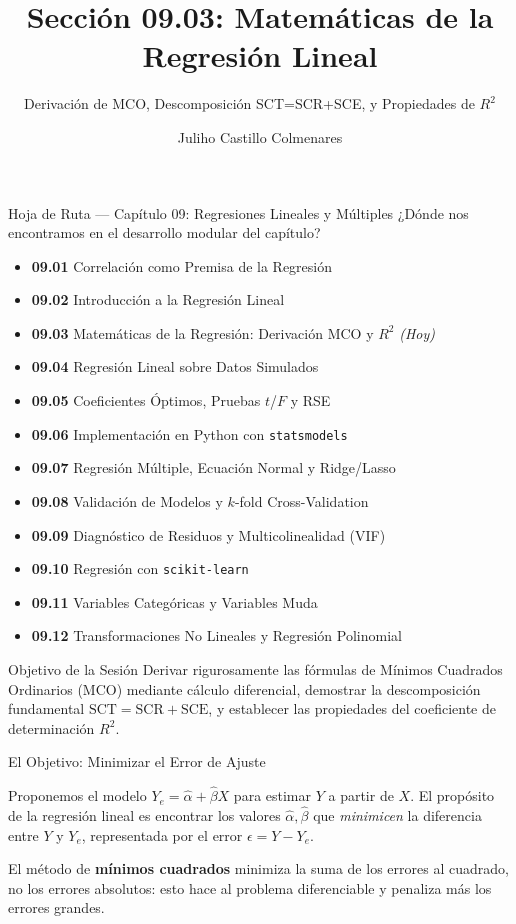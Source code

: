 \documentclass[10pt, aspectratio=169]{beamer}
\title[Matemáticas de la Regresión]{Sección 09.03: Matemáticas de la Regresión Lineal}
\subtitle{Derivación de MCO, Descomposición SCT=SCR+SCE, y Propiedades de $R^2$}
\author[J. Castillo Colmenares]{Juliho Castillo Colmenares}
\institute{Tecnológico de Monterrey}
\date{\vspace{-1.2cm}}
\begin{document}
\begin{frame}[plain]
  \vspace{-0.8cm}
  \titlepage
\end{frame}

\begin{frame}{Hoja de Ruta --- Capítulo 09: Regresiones Lineales y Múltiples}
  \scriptsize
  ¿Dónde nos encontramos en el desarrollo modular del capítulo?
  \begin{itemize}\itemsep=0.02em
    \item \textbf{09.01} Correlación como Premisa de la Regresión
    \item \textbf{09.02} Introducción a la Regresión Lineal
    \item \textbf{09.03} Matemáticas de la Regresión: Derivación MCO y $R^2$ \emph{(Hoy)}
    \item \textbf{09.04} Regresión Lineal sobre Datos Simulados
    \item \textbf{09.05} Coeficientes Óptimos, Pruebas $t$/$F$ y RSE
    \item \textbf{09.06} Implementación en Python con \texttt{statsmodels}
    \item \textbf{09.07} Regresión Múltiple, Ecuación Normal y Ridge/Lasso
    \item \textbf{09.08} Validación de Modelos y $k$-fold Cross-Validation
    \item \textbf{09.09} Diagnóstico de Residuos y Multicolinealidad (VIF)
    \item \textbf{09.10} Regresión con \texttt{scikit-learn}
    \item \textbf{09.11} Variables Categóricas y Variables Muda
    \item \textbf{09.12} Transformaciones No Lineales y Regresión Polinomial
  \end{itemize}
  \pause
  \vspace{-0.05cm}
  \begin{block}{Objetivo de la Sesión}
    Derivar rigurosamente las fórmulas de Mínimos Cuadrados Ordinarios (MCO) mediante cálculo diferencial, demostrar la descomposición fundamental $\text{SCT}=\text{SCR}+\text{SCE}$, y establecer las propiedades del coeficiente de determinación $R^2$.
  \end{block}
\end{frame}

\begin{frame}{El Objetivo: Minimizar el Error de Ajuste}
  \footnotesize
  \begin{motivacion}
    Proponemos el modelo $Y_e=\hat\alpha+\hat\beta X$ para estimar $Y$ a partir de $X$. El propósito de la regresión lineal es encontrar los valores $\hat\alpha,\hat\beta$ que \emph{minimicen} la diferencia entre $Y$ y $Y_e$, representada por el error $\epsilon=Y-Y_e$.
  \end{motivacion}

  \vspace{0.15cm}
  \pause
  El método de \textbf{mínimos cuadrados} minimiza la suma de los errores al cuadrado, no los errores absolutos: esto hace al problema diferenciable y penaliza más los errores grandes.
\end{frame}
\end{document}
